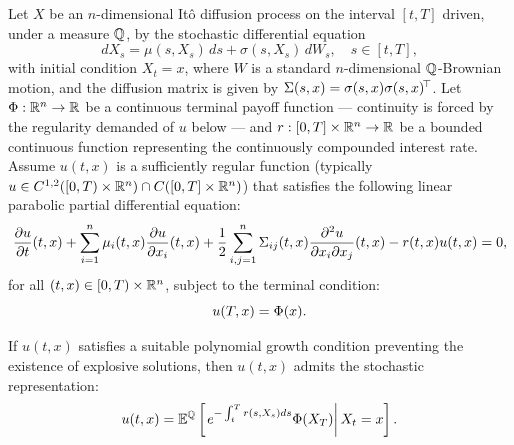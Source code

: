 \begin{theorem}\label{thm:feynmankac}
    Let $X$ be an $n$-dimensional Itô diffusion process on the interval $[t, T]$ driven, under a measure $\mathbb{Q}$, by the stochastic differential equation
    \begin{equation}
        dX_s = \mu(s, X_s)\,ds + \sigma(s, X_s)\,dW_s, \quad s \in [t, T],
    \end{equation}
    with initial condition $X_t = x$, where $W$ is a standard $n$-dimensional $\mathbb{Q}$-Brownian motion, and the diffusion matrix is given by $\Sigma(s, x) = \sigma(s,x)\sigma(s,x)^{\!\top}$. Let $\Phi: \mathbb{R}^n \rightarrow \mathbb{R}$ be a continuous terminal payoff function --- continuity is forced by the regularity demanded of $u$ below --- and $r: [0,T] \times \mathbb{R}^n \rightarrow \mathbb{R}$ be a bounded continuous function representing the continuously compounded interest rate. Assume $u(t,x)$ is a sufficiently regular function (typically $u \in C^{1,2}([0,T) \times \mathbb{R}^n) \cap C([0,T] \times \mathbb{R}^n)$) that satisfies the following linear parabolic partial differential equation:
    \begin{equation}\label{FK_PDE}
        \frac{\partial u}{\partial t}(t,x) + \sum_{i=1}^n \mu_i(t,x) \frac{\partial u}{\partial x_i}(t,x) + \frac{1}{2} \sum_{i,j=1}^n \Sigma_{ij}(t,x) \frac{\partial^2 u}{\partial x_i \partial x_j}(t,x) - r(t,x)u(t,x) = 0,
    \end{equation}
    for all $(t,x) \in [0,T) \times \mathbb{R}^n$, subject to the terminal condition:
    \begin{equation}
        u(T,x) = \Phi(x).
    \end{equation}
    
    If $u(t,x)$ satisfies a suitable polynomial growth condition preventing the existence of explosive solutions, then $u(t,x)$ admits the stochastic representation:
    \begin{equation}\label{FK_Expectation}
        u(t,x) = \mathbb{E}^{\mathbb{Q}} \left[ \left. e^{-\int_t^T r(s, X_s) ds} \Phi(X_T) \right| X_t = x \right].
    \end{equation}
\qedopen
\end{theorem}


